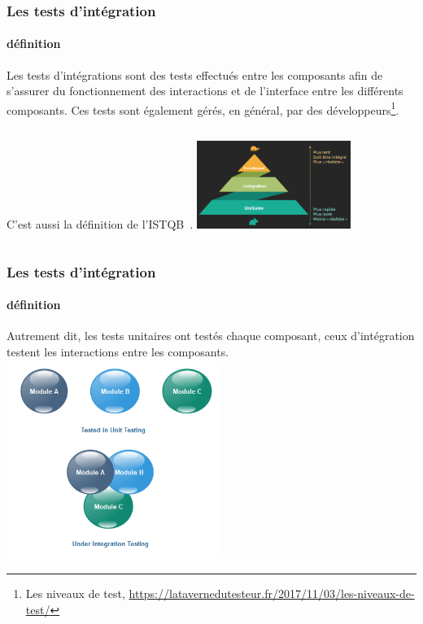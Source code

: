 \documentclass{beamer}
\begin{document}
    \begin{frame}
        \transdissolve
        \frametitle{Les tests d'intégration}
        \framesubtitle{définition}
        Les tests d’intégrations sont des tests effectués entre les composants afin de s’assurer du fonctionnement des interactions et de l’interface entre les différents composants.
        Ces tests sont également gérés, en général, par des développeurs\footnote{Les niveaux de test, \url{https://latavernedutesteur.fr/2017/11/03/les-niveaux-de-test/}}.
        \begin{columns}
            C'est aussi la définition de l'ISTQB\footnotemark~.
            \centering
            \includegraphics[width=5cm]{image/classic-test-pyramid}
        \end{columns}
    \end{frame}

    \begin{frame}
        \transdissolve
        \frametitle{Les tests d'intégration}
        \framesubtitle{définition}
        Autrement dit, les tests unitaires ont testés chaque composant, ceux d'intégration testent les interactions entre les composants.
        \bigbreak
        \centering
        \includegraphics[width=7cm]{image/integration-testing-vs-unit-testing}
    \end{frame}
\end{document}
